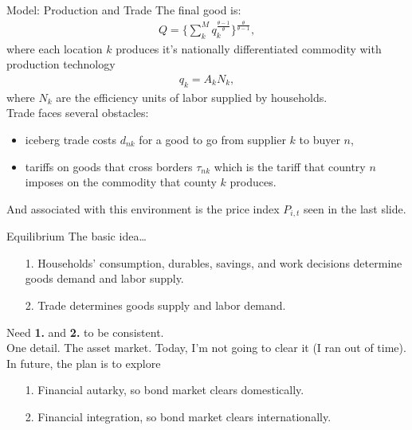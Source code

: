 \documentclass[9pt,pdftex,aspectratio=1610]{beamer}
\theoremstyle{definition}
\begin{document}

\begin{frame}[t]{Model: Production and Trade}
\medskip
The final good is:
\begin{align*}
Q = \bigg \{ \sum_{k}^{M}  q_{k}^{\frac{\theta - 1}{\theta}} \bigg \}^{\frac{\theta}{\theta - 1}},
\end{align*}
where each location $k$ produces it's nationally differentiated commodity with production technology
\begin{align*}
q_k = A_k N_k,
\end{align*}
where $N_k$ are the efficiency units of labor supplied by households.\\
\bigskip
Trade faces several obstacles:
\begin{itemize}
\smallskip
\item iceberg trade costs $d_{nk}$ for a good to go from supplier $k$ to buyer $n$,
\smallskip
\item tariffs on goods that cross borders $\tau_{nk}$ which is the tariff that country $n$ imposes on the commodity that county $k$ produces.
\end{itemize}
\smallskip
And associated with this environment is the price index $P_{i,t}$ seen in the last slide.
\end{frame}

\begin{frame}[t]{Equilibrium}
\medskip
The basic idea\ldots
\begin{itemize}
\smallskip
\item[1.] Households' consumption, durables, savings, and work decisions determine goods demand and labor supply.
\smallskip
\item[2.] Trade determines goods supply and labor demand.
\end{itemize}
\medskip
Need \textbf{1.} and \textbf{2.} to be consistent.\\
\bigskip
\medskip
One detail. The asset market. Today, I'm not going to clear it (I ran out of time). In future, the plan is to explore
\begin{itemize}
\smallskip
\item[1.] Financial autarky, so bond market clears domestically.
\smallskip
\item[2.] Financial integration, so bond market clears internationally.
\end{itemize}
\end{frame}
\end{document}
